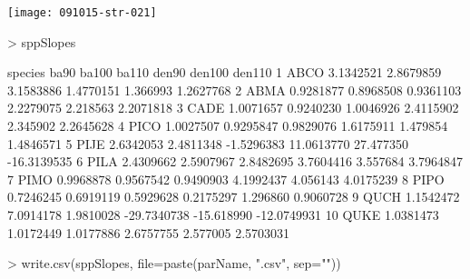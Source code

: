 \documentclass{article}
\begin{document}
\texttt{[image: 091015-str-021]}
\begin{Schunk}
\begin{Sinput}
>   sppSlopes
\end{Sinput}
\begin{Soutput}
   species      ba90     ba100      ba110       den90     den100      den110
1     ABCO 3.1342521 2.8679859  3.1583886   1.4770151   1.366993   1.2627768
2     ABMA 0.9281877 0.8968508  0.9361103   2.2279075   2.218563   2.2071818
3     CADE 1.0071657 0.9240230  1.0046926   2.4115902   2.345902   2.2645628
4     PICO 1.0027507 0.9295847  0.9829076   1.6175911   1.479854   1.4846571
5     PIJE 2.6342053 2.4811348 -1.5296383  11.0613770  27.477350 -16.3139535
6     PILA 2.4309662 2.5907967  2.8482695   3.7604416   3.557684   3.7964847
7     PIMO 0.9968878 0.9567542  0.9490903   4.1992437   4.056143   4.0175239
8     PIPO 0.7246245 0.6919119  0.5929628   0.2175297   1.296860   0.9060728
9     QUCH 1.1542472 7.0914178  1.9810028 -29.7340738 -15.618990 -12.0749931
10    QUKE 1.0381473 1.0172449  1.0177886   2.6757755   2.577005   2.5703031
\end{Soutput}
\begin{Sinput}
>     write.csv(sppSlopes, file=paste(parName, ".csv", sep=""))
\end{Sinput}
\end{Schunk}
\end{document}
